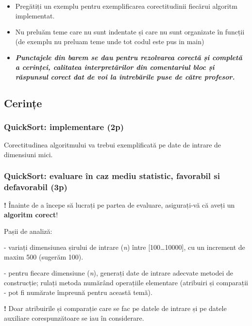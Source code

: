 \documentclass[../ro-fa-lab.tex]{subfiles}
\begin{document}
\begin{itemize}
\item
  Pregătiți un exemplu pentru exemplificarea corectitudinii fiecărui
  algoritm implementat.
\item
  Nu preluăm teme care nu sunt indentate și care nu sunt organizate în
  funcții (de exemplu nu preluam teme unde tot codul este pus in main)
\end{itemize}

\begin{itemize}
\item
  \emph{\textbf{Punctajele din barem se dau pentru rezolvarea corectă și
  completă a cerinței, calitatea interpretărilor din comentariul bloc și
  răspunsul corect dat de voi la întrebările puse de către profesor.}}
\end{itemize}

\subsection{Cerințe}\label{cerinux21be}

\subsubsection{QuickSort: implementare
(2p)}\label{quicksort-implementare-2p}

Corectitudinea algoritmului va trebui exemplificată pe date de intrare
de dimensiuni mici.

\subsubsection{QuickSort: evaluare în caz mediu statistic, favorabil si
defavorabil
(3p)}\label{quicksort-evaluare-uxeen-caz-mediu-statistic-favorabil-si-defavorabil-3p}

\textbf{!} Înainte de a începe să lucrați pe partea de evaluare,
asigurați-vă că aveți un \textbf{algoritm corect}!

Pașii de analiză:

- variați dimensiunea șirului de intrare (\emph{n}) între
{[}100\ldots10000{]}, cu un increment de maxim 500 (sugerăm 100).

- pentru fiecare dimensiune (\emph{n}), generați date de intrare
adecvate metodei de construcție; rulați metoda numărând operațiile
elementare (atribuiri și comparații - pot fi numărate împreună pentru
această temă).

\textbf{!} Doar atribuirile și comparație care se fac pe datele de
intrare și pe datele auxiliare corespunzătoare se iau în considerare.
\end{document}
